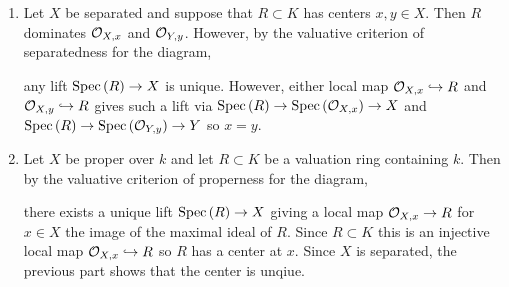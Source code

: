 \documentclass[12pt]{article}
\begin{document}
\begin{enumerate}
\item Let $X$ be separated and suppose that $R \subset K$ has centers $x,y \in X$. Then $R$ dominates $\mathcal{O}_{X, x}$ and $\mathcal{O}_{Y, y}$. However, by the valuative criterion of separatedness for the diagram,
\begin{center}
\end{center}
any lift $\mathrm{Spec}\left( R \right) \to X$ is unique. However, either local map $\mathcal{O}_{X, x} \hookrightarrow R$ and $\mathcal{O}_{X, y} \hookrightarrow R$ gives such a lift via $\mathrm{Spec}\left( R \right) \to \mathrm{Spec}\left( \mathcal{O}_{X, x} \right) \to X$ and $\mathrm{Spec}\left( R \right) \to \mathrm{Spec}\left( \mathcal{O}_{Y, y} \right) \to Y$ so $x = y$.

\item Let $X$ be proper over $k$ and let $R \subset K$ be a valuation ring containing $k$. Then by the valuative criterion of properness for the diagram,
\begin{center}
\end{center}
there exists a unique lift $\mathrm{Spec}\left( R \right) \to X$ giving a local map $\mathcal{O}_{X, x} \to R$ for $x \in X$ the image of the maximal ideal of $R$. Since $R \subset K$ this is an injective local map $\mathcal{O}_{X, x} \hookrightarrow R$ so $R$ has a center at $x$. Since $X$ is separated, the previous part shows that the center is unqiue.


\end{enumerate}
\end{document}
